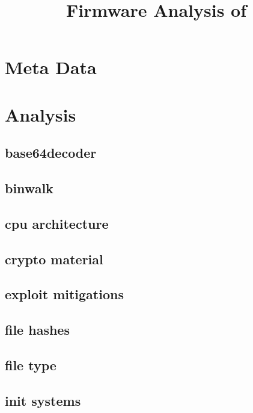 \documentclass{article}
\begin{document}
\title{Firmware Analysis of }

\maketitle

\section*{Meta Data}


\section*{Analysis}

\subsection*{base64decoder}


\subsection*{binwalk}


\subsection*{cpu architecture}


\subsection*{crypto material}


\subsection*{exploit mitigations}


\subsection*{file hashes}


\subsection*{file type}


\subsection*{init systems}

\end{document}
